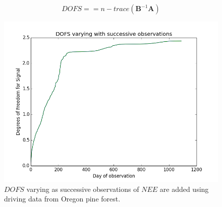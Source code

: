 \documentclass[11pt]{article}
\begin{document}
\[
DOFS==n-trace(\textbf{B}^{-1}\textbf{A})
\]

\begin{figure}[ht]
\centering
\includegraphics[width=1\textwidth]{DOFS_0_1090Cf_Cpoolsconst.png}
\caption{$DOFS$ varying as successive observations of $NEE$ are added using driving data from Oregon pine forest.}
\label{fig:SIC_subplot}
\end{figure}

{}

\end{document}
